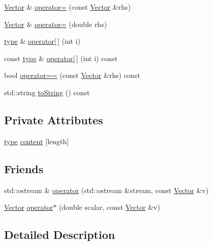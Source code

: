 \begin{DoxyCompactItemize}
\item 
\hyperlink{classutils_1_1Vector}{Vector} \& \hyperlink{classutils_1_1Vector_a16812f2bf90d9e79b58fd42860c111e7}{operator=} (const \hyperlink{classutils_1_1Vector}{Vector} \&rhs)
\item 
\hyperlink{classutils_1_1Vector}{Vector} \& \hyperlink{classutils_1_1Vector_a5c1cfa1d42abdd9a90b4913892608386}{operator=} (double rhs)
\item 
\hyperlink{classtype}{type} \& \hyperlink{classutils_1_1Vector_a391fe7cbc2441879439fbc191ec4ef03}{operator\mbox{[}$\,$\mbox{]}} (int i)
\item 
const \hyperlink{classtype}{type} \& \hyperlink{classutils_1_1Vector_a3b965c400abae02fcad3751cf4b79309}{operator\mbox{[}$\,$\mbox{]}} (int i) const 
\item 
bool \hyperlink{classutils_1_1Vector_a04ceba4a8df8a367205d1c57063ec3f8}{operator==} (const \hyperlink{classutils_1_1Vector}{Vector} \&rhs) const 
\item 
std\-::string \hyperlink{classutils_1_1Vector_ab71fcfc3a0e80ee4a7d2c0fc76fed9a0}{to\-String} () const 
\end{DoxyCompactItemize}
\subsection*{Private Attributes}
\begin{DoxyCompactItemize}
\item 
\hyperlink{classtype}{type} \hyperlink{classutils_1_1Vector_ab391d67eb8f8563b4dd4b80390a4631a}{content} \mbox{[}length\mbox{]}
\end{DoxyCompactItemize}
\subsection*{Friends}
\begin{DoxyCompactItemize}
\item 
std\-::ostream \& \hyperlink{classutils_1_1Vector_a49b910c983e6c91855b55ab04d401e4f}{operator} (std\-::ostream \&stream, const \hyperlink{classutils_1_1Vector}{Vector} \&v)
\item 
\hyperlink{classutils_1_1Vector}{Vector} \hyperlink{classutils_1_1Vector_a45c43d96a8bbe774870183ff33079584}{operator$\ast$} (double scalar, const \hyperlink{classutils_1_1Vector}{Vector} \&v)
\end{DoxyCompactItemize}


\subsection{Detailed Description}
